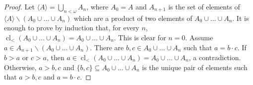 \documentclass[10pt,a4paper]{article}
\DeclareMathOperator{\cl}{cl}
\theoremstyle{note}
\begin{document}
\begin{proof}
	Let $\langle A\rangle = \bigcup_{n<\omega}A_n$, where $A_0=A$  and $A_{n+1}$ is the set of elements  of $\langle A\rangle\smallsetminus (A_0\cup \ldots \cup A_n)$  which are a product of two elements of $A_0\cup \ldots 	\cup A_n$.  It is enough to prove by induction that, for every $n$,   $\cl_<(A_0\cup \ldots \cup A_n)= A_0\cup\ldots\cup A_n$. This is clear for $n=0$. Assume $a\in A_{n+1}\smallsetminus (A_0\cup\ldots \cup A_n)$. There are $b,c\in A_0\cup \ldots \cup A_n$  such that $a=b\cdot c$. If $b>a$ or $c>a$, then $a\in \cl_<(A_0\cup \ldots \cup A_n)= A_0\cup \ldots \cup A_n$, a contradiction. Otherwise, $a>b,c$ and $\{b,c\}\subseteq A_0\cup\ldots\cup A_n$ is the unique pair of elements such that $a>b,c$ and $a=b\cdot c$.
\end{proof}
\end{document}
